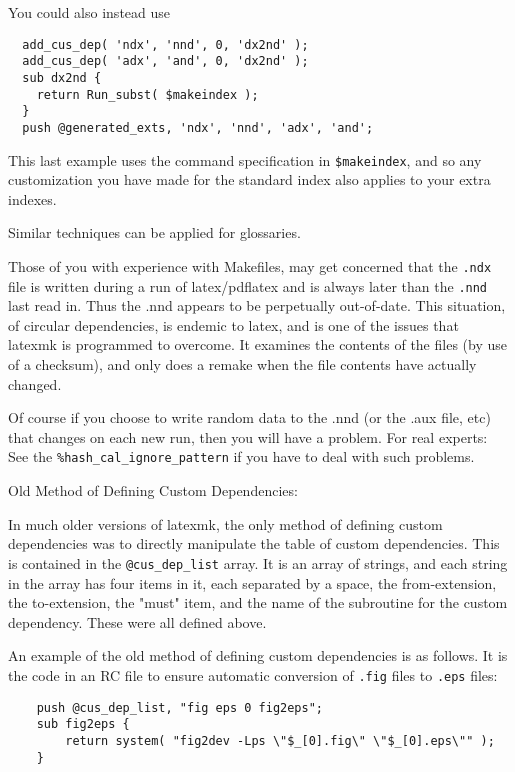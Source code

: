 You could also instead use

\begin{verbatim}
  add_cus_dep( 'ndx', 'nnd', 0, 'dx2nd' );
  add_cus_dep( 'adx', 'and', 0, 'dx2nd' );
  sub dx2nd {
    return Run_subst( $makeindex );
  }
  push @generated_exts, 'ndx', 'nnd', 'adx', 'and';
\end{verbatim}

This  last example uses the command specification in \verb|$makeindex|, and so
any customization you have made for the standard index also applies  to
your extra indexes.

Similar techniques can be applied for glossaries.

Those of you with experience with Makefiles, may get concerned that the \verb|.ndx|
file is written during a run of latex/pdflatex and is always later than  the
\verb|.nnd|  last read in.  Thus the .nnd appears to be perpetually out-of-date.  This
situation, of circular dependencies, is  endemic  to latex, and is one of the
issues that latexmk is programmed to overcome.  It examines the contents of the
files (by use of a checksum), and  only does a remake when the file contents
have actually changed.

Of  course  if you choose to write random data to the .nnd (or the .aux
file, etc) that changes on each new run, then you will have a  problem.
For  real experts: See the \verb|%hash_cal_ignore_pattern| if you have to deal
with such problems.

Old Method of Defining Custom Dependencies:

In much older versions of latexmk, the only method of  defining  custom
dependencies  was  to directly manipulate the table of custom dependencies.
This is contained in the \verb|@cus_dep_list| array.  It is an array of strings,  and
each string in the array has four items in it, each separated by a space, the
from-extension,  the  to-extension,  the  "must" item,  and the name of the
subroutine for the custom dependency.  These were all defined above.

An example of the old method of defining custom dependencies is as follows.  It
is  the code in an RC file to ensure automatic conversion of \verb|.fig| files
to \verb|.eps| files:

\begin{verbatim}
	push @cus_dep_list, "fig eps 0 fig2eps";
	sub fig2eps {
		return system( "fig2dev -Lps \"$_[0].fig\" \"$_[0].eps\"" );
	}
\end{verbatim}

